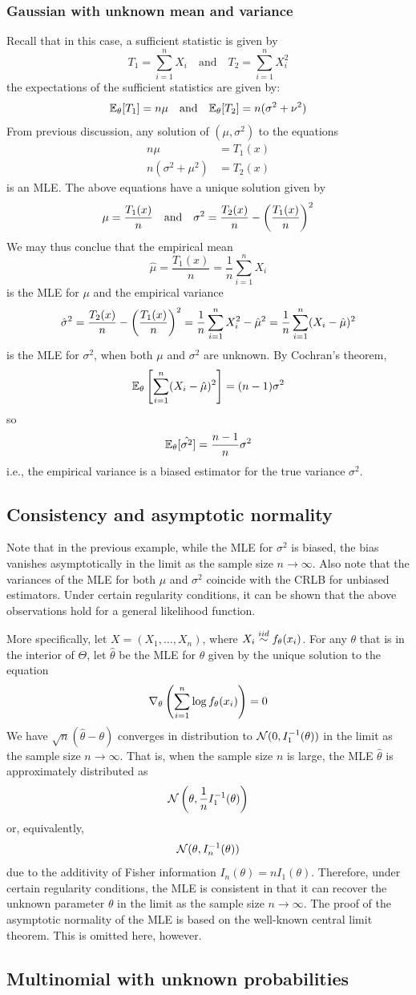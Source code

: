 \documentclass[11pt]{book}
\begin{document}
\subsubsection{Gaussian with unknown mean and variance}
Recall that in this case, a sufficient statistic is given by 
\[
  T_1 = \sum_{i=1}^n X_i \quad\text{and}\quad T_2 = \sum_{i=1}^n X_i^2
\]
the expectations of the sufficient statistics are given by: 
\[
  \mathbb{E}_\theta[T_1] = n\mu \quad\text{and}\quad \mathbb{E}_\theta[T_2] = n(\sigma^2 + \nu^2)
\]
From previous discussion, any solution of $(\mu, \sigma^2)$ to the equations 
\begin{align*}
  n\mu &= T_1(x) \\ 
  n(\sigma^2 + \mu^2) &= T_2(x)
\end{align*}
is an MLE. The above equations have a unique solution given by 
\[
  \mu = \frac{T_1(x)}{n} \quad\text{and}\quad \sigma^2 = \frac{T_2(x)}{n} - \left( \frac{T_1(x)}{n} \right)^2
\]
  We may thus conclue that the empirical mean 
  \[
    \hat{\mu} = \frac{T_1(x)}{n} = \frac{1}{n} \sum_{i=1}^n X_i
  \]
  is the MLE for $\mu$ and the empirical variance 
  \[
    \hat{\sigma}^2 = \frac{T_2(x)}{n} - \left( \frac{T_1(x)}{n} \right)^2 = \frac{1}{n}\sum_{i=1}^n X_i^2 - \hat{\mu}^2 = \frac{1}{n}\sum_{i=1}^n (X_i - \hat{\mu})^2 
  \]
  is the MLE for $\sigma^2$, when both $\mu$ and $\sigma^2$ are unknown. By Cochran's theorem,
  \[
    \mathbb{E}_\theta \left[ \sum_{i=1}^n (X_i - \hat{\mu})^2\right] = (n-1)\sigma^2 
  \]
  so 
  \[
    \mathbb{E}_\theta[\hat{\sigma^2}] = \frac{n-1}{n}\sigma^2 
  \] 
  i.e., the empirical variance is a biased estimator for the true variance $\sigma^2$.

\subsection{Consistency and asymptotic normality}
Note that in the previous example, while the MLE for $\sigma^2$ is biased, the bias vanishes asymptotically in the limit as the sample size $n\to\infty$. Also note that the variances of the MLE for both $\mu$ and $\sigma^2$ coincide with the CRLB for unbiased estimators. Under certain regularity conditions, it can be shown that the above observations hold for a general likelihood function.

More specifically, let $X = (X_1, \dots, X_n)$, where $X_i \overset{iid}{\sim} f_\theta(x_i)$. For any $\theta$ that is in the interior of $\Theta$, let $\hat{\theta}$ be the MLE for $\theta$ given by the unique solution to the equation 
\[
  \nabla_\theta \left( \sum_{i=1}^n \log f_\theta(x_i) \right) = 0
\] 
We have $\sqrt{n}(\hat{\theta} - \theta)$ converges in distribution to $\mathcal{N}(0, I_1^{-1}(\theta))$ in the limit as the sample size $n\to\infty$.
That is, when the sample size $n$ is large, the MLE $\hat{\theta}$ is approximately distributed as 
\[
  \mathcal{N} \left( \theta, \frac{1}{n}I_1^{-1}(\theta) \right)
\] 
or, equivalently,
\[
  \mathcal{N} (\theta,I_n^{-1}(\theta))
\] 
due to the additivity of Fisher information $I_n(\theta) = n I_1(\theta)$. Therefore, under certain regularity conditions, the MLE is consistent in that it can recover the unknown parameter $\theta$ in the limit as the sample size $n\to\infty$. The proof of the asymptotic normality of the MLE is based on the well-known central limit theorem. This is omitted here, however.

\subsection{Multinomial with unknown probabilities}
\end{document}
